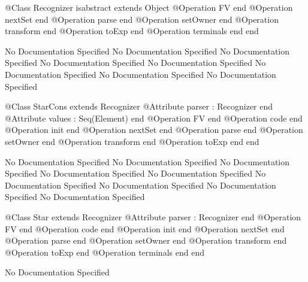 \begin{Interface}
@Class Recognizer isabstract extends Object
  @Operation FV end
  @Operation nextSet end
  @Operation parse end
  @Operation setOwner end
  @Operation transform end
  @Operation toExp end
  @Operation terminals end
end
\end{Interface}
No Documentation Specified
No Documentation Specified
No Documentation Specified
No Documentation Specified
No Documentation Specified
No Documentation Specified
No Documentation Specified
No Documentation Specified
\begin{Interface}
@Class StarCons extends Recognizer
  @Attribute parser : Recognizer end
  @Attribute values : Seq(Element) end
  @Operation FV end
  @Operation code end
  @Operation init end
  @Operation nextSet end
  @Operation parse end
  @Operation setOwner end
  @Operation transform end
  @Operation toExp end
end
\end{Interface}
No Documentation Specified
No Documentation Specified
No Documentation Specified
No Documentation Specified
No Documentation Specified
No Documentation Specified
No Documentation Specified
No Documentation Specified
No Documentation Specified
\begin{Interface}
@Class Star extends Recognizer
  @Attribute parser : Recognizer end
  @Operation FV end
  @Operation code end
  @Operation init end
  @Operation nextSet end
  @Operation parse end
  @Operation setOwner end
  @Operation transform end
  @Operation toExp end
  @Operation terminals end
end
\end{Interface}
No Documentation Specified
